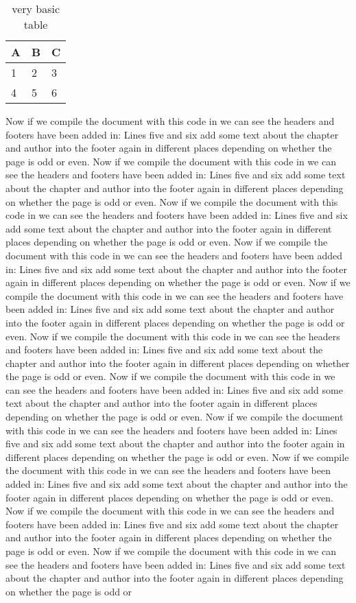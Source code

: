  
 \begin{table}[h]
\centering
\begin{tabular}{l | l | l}
A & B & C \\
\hline
1 & 2 & 3 \\
4 & 5 & 6
\end{tabular}
\caption{very basic table}
\label{tab:abc}
\end{table}

 \par Now if we compile the document with this code in we can see the headers and footers have been added in: Lines five and six add some text about the chapter and author into the footer again in different places depending on whether the page is odd or even. Now if we compile the document with this code in we can see the headers and footers have been added in: Lines five and six add some text about the chapter and author into the footer again in different places depending on whether the page is odd or even. Now if we compile the document with this code in we can see the headers and footers have been added in: Lines five and six add some text about the chapter and author into the footer again in different places depending on whether the page is odd or even. Now if we compile the document with this code in we can see the headers and footers have been added in: Lines five and six add some text about the chapter and author into the footer again in different places depending on whether the page is odd or even. Now if we compile the document with this code in we can see the headers and footers have been added in: Lines five and six add some text about the chapter and author into the footer again in different places depending on whether the page is odd or even. Now if we compile the document with this code in we can see the headers and footers have been added in: Lines five and six add some text about the chapter and author into the footer again in different places depending on whether the page is odd or even. Now if we compile the document with this code in we can see the headers and footers have been added in: Lines five and six add some text about the chapter and author into the footer again in different places depending on whether the page is odd or even. Now if we compile the document with this code in we can see the headers and footers have been added in: Lines five and six add some text about the chapter and author into the footer again in different places depending on whether the page is odd or even. Now if we compile the document with this code in we can see the headers and footers have been added in: Lines five and six add some text about the chapter and author into the footer again in different places depending on whether the page is odd or even. Now if we compile the document with this code in we can see the headers and footers have been added in: Lines five and six add some text about the chapter and author into the footer again in different places depending on whether the page is odd or even. Now if we compile the document with this code in we can see the headers and footers have been added in: Lines five and six add some text about the chapter and author into the footer again in different places depending on whether the page is odd or 